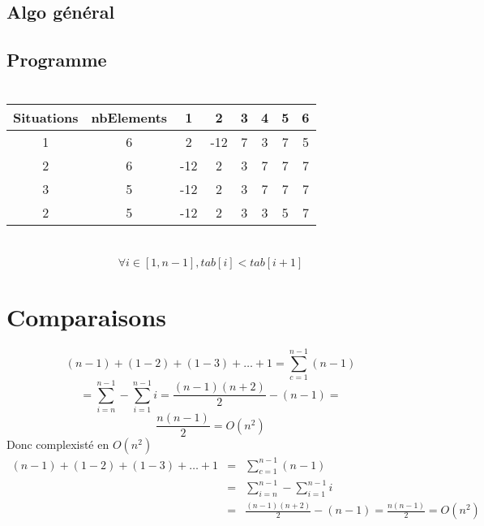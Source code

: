 \documentclass{article}
\begin{document}
	\subsection{}
			
	\section{}
			
	\section{}
		\subsection{Algo général}
			
		\subsection{Programme}	
			
		\section{}
			\begin{tabular}{|c|c|c|c|c|c|c|c|}
				\hline
					\textbf{Situations} &
					\textbf{nbElements} &
					\textbf{1} &
					\textbf{2} &
					\textbf{3} &
					\textbf{4} &
					\textbf{5} &
					\textbf{6}\\ 
				\hline
					1 & 6 & 2 &-12 & 7 & 3 & 7 & 5\\
				\hline
					2 & 6 & -12 &2 & 3 & 7 & 7 & 7\\
				\hline
					3 & 5 & -12 &2 & 3 & 7 & 7 & 7\\
				\hline
					2 & 5 & -12 &2 & 3 & 3 & 5 & 7\\
				\hline
			\end{tabular}
		\section{}	
			$$ \forall i \in [1,n-1], tab[i] < tab[i+1]$$ 
		\section{Comparaisons}
			$$(n-1)+(1-2)+(1-3)+\dots+1=\sum^{n-1}_{c=1}{(n-1)}$$
			$$=\sum^{n-1}_{i=n}-\sum^{n-1}_{i=1}{i} = \frac{(n-1)(n+2)}{2} - (n-1) = $$
			$$\frac{n(n-1)}{2}=O(n^{2})$$
			Donc complexisté en $O(n^{2})$
		\begin{eqnarray*}
			(n-1)+(1-2)+(1-3)+\dots+1&=&\sum^{n-1}_{c=1}{(n-1)} \\
			&=&\sum^{n-1}_{i=n}-\sum^{n-1}_{i=1}{i} \\
			&=& \frac{(n-1)(n+2)}{2} - (n-1) = 
			\frac{n(n-1)}{2}=O(n^{2})
		\end{eqnarray*} 
	
	
\end{document}
